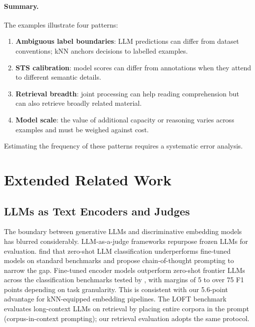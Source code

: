 \paragraph{Summary.}
The examples illustrate four patterns:
\begin{enumerate}
\item \textbf{Ambiguous label boundaries}: LLM predictions can differ from dataset conventions; kNN anchors decisions to labelled examples.
\item \textbf{STS calibration}: model scores can differ from annotations when they attend to different semantic details.
\item \textbf{Retrieval breadth}: joint processing can help reading comprehension but can also retrieve broadly related material.
\item \textbf{Model scale}: the value of additional capacity or reasoning varies across examples and must be weighed against cost.
\end{enumerate}
Estimating the frequency of these patterns requires a systematic error analysis.


\section{Extended Related Work}
\label{app:extended_related}

\subsection{LLMs as Text Encoders and Judges}

The boundary between generative LLMs and discriminative embedding models has blurred considerably.
LLM-as-a-judge frameworks \citep{zheng2023judging} repurpose frozen LLMs for evaluation. \citet{sun2023textclassificationlargelanguage} find that zero-shot LLM classification underperforms fine-tuned models on standard benchmarks and propose chain-of-thought prompting to narrow the gap.
Fine-tuned encoder models outperform zero-shot frontier LLMs across the classification benchmarks tested by \citet{bucher2024finetuned}, with margins of 5 to over 75 F1 points depending on task granularity. This is consistent with our 5.6-point advantage for kNN-equipped embedding pipelines.
The LOFT benchmark \citep{lee2024longcontextlanguagemodelssubsume} evaluates long-context LLMs on retrieval by placing entire corpora in the prompt (corpus-in-context prompting); our retrieval evaluation adopts the same protocol.

